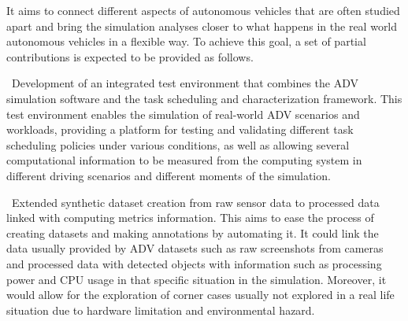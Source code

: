 It aims to connect different aspects of autonomous vehicles that are often studied apart and bring the simulation analyses closer to what happens in the real world autonomous vehicles in a flexible way. To achieve this goal, a set of partial contributions is expected to be provided as follows.



\textbullet\ Development of an integrated test environment that combines the ADV simulation software and the task scheduling and characterization framework. This test environment enables the simulation of real-world ADV scenarios and workloads, providing a platform for testing and validating different task scheduling policies under various conditions, as well as allowing several computational information to be measured from the computing system in different driving scenarios and different moments of the simulation.

\textbullet\ Extended synthetic dataset creation from raw sensor data to processed data linked with computing metrics information. This aims to ease the process of creating datasets and making annotations by automating it. It could link the data usually provided by ADV datasets such as raw screenshots from cameras and processed data with detected objects with information such as processing power and CPU usage in that specific situation in the simulation. Moreover, it would allow for the exploration of corner cases usually not explored in a real life situation due to hardware limitation and environmental hazard.

